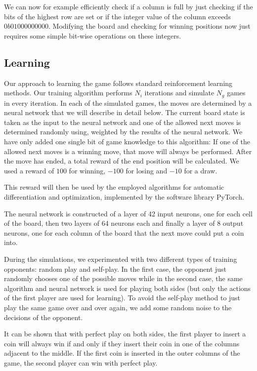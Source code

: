 \documentclass[10pt,twocolumn,letterpaper]{article}
\begin{document}
We can now for example efficiently check if a column is full by just checking if the bits of the highest row are set or if the integer value of the column exceeds $0b01000000000$.
Modifying the board and checking for winning positions now just requires some simple bit-wise operations on these integers.

\subsection{Learning}
Our approach to learning the game follows standard reinforcement learning methods.
Our training algorithm performs $N_i$ iterations and simulate $N_g$ games in every iteration.
In each of the simulated games, the moves are determined by a neural network that we will describe in detail below.
The current board state is taken as the input to the neural network and one of the allowed next moves is determined randomly using, weighted by the results of the neural network.
We have only added one single bit of game knowledge to this algorithm: If one of the allowed next moves is a winning move, that move will always be performed.
After the move has ended, a total reward of the end position will be calculated.
We used a reward of $100$ for winning, $-100$ for losing and $-10$ for a draw.

This reward will then be used by the employed algorithms for automatic differentiation and optimization\cite{Adam}, implemented by the software library PyTorch\cite{PyTorch}.

The neural network is constructed of a layer of 42 input neurons, one for each cell of the board, then two layers of 64 neurons each and finally a layer of 8 output neurons, one for each column of the board that the next move could put a coin into.

During the simulations, we experimented with two different types of training opponents: random play and self-play.
In the first case, the opponent just randomly chooses one of the possible moves while in the second case, the same algorithm and neural network is used for playing both sides (but only the actions of the first player are used for learning).
To avoid the self-play method to just play the same game over and over again, we add some random noise to the decisions of the opponent.

It can be shown that with perfect play on both sides, the first player to insert a coin will always win if and only if they insert their coin in one of the columns adjacent to the middle.
If the first coin is inserted in the outer columns of the game, the second player can win with perfect play.
\end{document}
